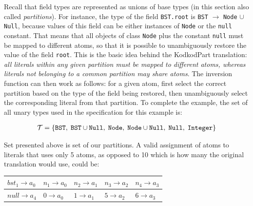 \documentclass[11pt,twoside,a4paper]{book}
\begin{document}
Recall that field types are represented as unions of base types (in this section also
called \textit{partitions}). For instance, the type of the field \verb|BST.root|
is \verb|BST| $\rightarrow$ \verb|Node| $\cup$ \verb|Null|, because values of
this field can be either instances of \verb|Node| or the \verb|null| constant.
That means that all objects of class \verb|Node| plus the constant \verb|null|
must be mapped to different atoms, so that it is possible to unambiguously
restore the value of the field \verb|root|. This is the basic idea behind the
KodkodPart translation: \textit{all literals within any given partition must be
mapped to different atoms, whereas literals not belonging to a common partition may
share atoms}. The inversion function can then work as follows: for a given atom,
first select the correct partition based on the type of the field being
restored, then unambiguously select the corresponding literal from that
partition. To complete the example, the set of all unary types used in the
specification for this example is:

\begin{center}
\begin{align*}
	\mathcal{T}& =\{\texttt{BST},\hspace{1mm}
	\texttt{BST}\cup\texttt{Null},\hspace{1mm} \texttt{Node},\hspace{1mm}
	\texttt{Node} \cup \texttt{Null}, \hspace{1mm} \texttt{Null},\hspace{1mm} \texttt{Integer}\}\\
\end{align*}
\end{center}

Set presented above is set of our partitions. A valid assignment of
atoms to literals that uses only 5 atoms, as opposed to 10 which is how many the
original translation would use, could be:

\begin{center}
\begin{tabular}{|l|l|l|l|l|}
  \hline
  $bst_1 \rightarrow a_0$ & $n_1 \rightarrow a_0$ & $n_2 \rightarrow a_1$ & $n_3
  \rightarrow a_2$ & $n_4 \rightarrow a_3$\\
  \hline
  $null \rightarrow a_4$ & $0 \rightarrow a_0$ & $1 \rightarrow a_1$ & $5
  \rightarrow a_2$ & $6 \rightarrow a_3$\\
  \hline
  \end{tabular}
\end{center}
\end{document}
